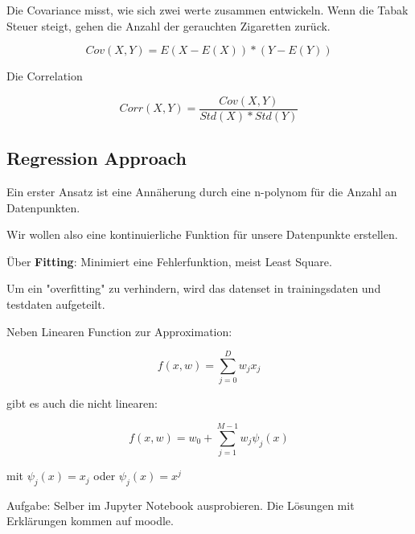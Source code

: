 \documentclass[a4paper]{article}
\begin{document}
Die Covariance misst, wie sich zwei werte zusammen entwickeln. Wenn die Tabak Steuer steigt, gehen die Anzahl der gerauchten Zigaretten zurück.

\[
Cov(X, Y) = E(X - E(X)) * (Y - E(Y))
\]

Die Correlation 

\[
Corr(X, Y) = \frac{Cov(X, Y)}{Std(X)*Std(Y)}
\]

\subsection{Regression Approach}

Ein erster Ansatz ist eine Annäherung durch eine n-polynom für die Anzahl an Datenpunkten.

Wir wollen also eine kontinuierliche Funktion für unsere Datenpunkte erstellen.

Über \textbf{Fitting}: Minimiert eine Fehlerfunktion, meist Least Square.


Um ein "overfitting" zu verhindern, wird das datenset in trainingsdaten und testdaten aufgeteilt. 

Neben Linearen Function zur Approximation:

\[
f(x, w) = \sum_{j=0}^{D} w_jx_j
\]

gibt es auch die nicht linearen:

\[
f(x, w) = w_0 + \sum_{j=1}^{M-1}w_j \psi_j(x)
\]

mit $\psi_j(x)=x_j$ oder $\psi_j(x)=x^j$

Aufgabe: Selber im Jupyter Notebook ausprobieren. Die Lösungen mit Erklärungen kommen auf moodle.
\end{document}
